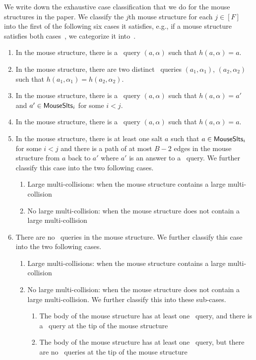 We write down the exhaustive case classification that we do for the mouse structures in the paper.
    We classify the $j$th mouse structure for each $j\in[F]$ into the first of the following six cases it satisfies, e.g., if a mouse structure satisfies both cases~, we categorize it into~. 
\begin{enumerate}
\item In the mouse structure, there is a \new\ query $(a,\alpha)$ such that $h(a,\alpha)=a$.
\item In the mouse structure, there are two distinct \new\ queries $(a_1,\alpha_1)$, $(a_2,\alpha_2)$ such that $h(a_1,\alpha_1)=h(a_2,\alpha_2)$.
\item In the mouse structure, there is a \new\ query $(a,\alpha)$ such that $h(a,\alpha)=a'$ and $a'\in \mathsf{MouseSlts}_i$ for some $i<j$. 
\item In the mouse structure, there is a \urep\ query $(a,\alpha)$ such that $h(a,\alpha)=a$. 
\item In the mouse structure, there is at least one salt $a$ such that $a\in \mathsf{MouseSlts}_i$ for some $i<j$ and there is a path of at most $B-2$ edges in the mouse structure from $a$ back to $a'$ where $a'$ is an answer to a \new\ query.
We further classify this case into the two following cases.
\begin{enumerate}
    \item Large multi-collisions: when the mouse structure contains a large multi-collision
    \item No large multi-collision: when the mouse structure does not contain a large multi-collision
\end{enumerate}
\item \label{case:norep}There are no \frep\ queries in the mouse structure.
We further classify this case into the two following cases.
\begin{enumerate}
    \item Large multi-collisions: when the mouse structure contains a large multi-collision
    \item No large multi-collision: when the mouse structure does not contain a large multi-collision. We further classify this into these sub-cases.
    \begin{enumerate}
        [label=(\alph*)]
  \item \label{case:norepa} The body of the mouse structure has at least one \new\ query, and there is a \new\ query at the tip of the mouse structure 
  \item \label{case:norepb} The body of the mouse structure has at least one \new\ query, but there are no \new\ queries at the tip of the mouse structure 

\end{enumerate}
\end{enumerate}
\end{enumerate}

